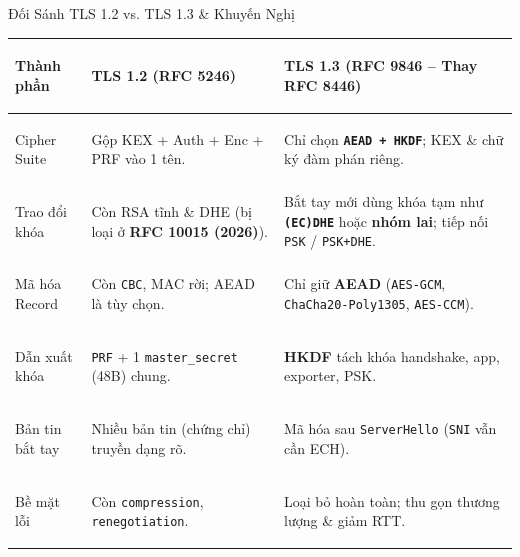 \documentclass[aspectratio=169, 10pt]{beamer}
\begin{document}
\begin{frame}{Đối Sánh TLS 1.2 vs. TLS 1.3 \& Khuyến Nghị}
	\centering
	\fontsize{6.1pt}{7.5pt}\selectfont
	\renewcommand{\arraystretch}{1.10}
	\setlength{\tabcolsep}{4.5pt}
	\begin{tabularx}{\textwidth}{>{\leavevmode\color{uetblue}\bfseries\raggedright\arraybackslash}p{2.35cm} >{\raggedright\arraybackslash}X >{\raggedright\arraybackslash}X}
		\toprule
		\rowcolor{uetaccentbg}
		Thành phần & \textbf{\color{uetblue}TLS 1.2 (RFC 5246)} & \textbf{\color{uetblue}TLS 1.3 (RFC 9846 -- Thay RFC 8446)} \\
		\midrule
		Cipher Suite & Gộp KEX + Auth + Enc + PRF vào 1 tên. & Chỉ chọn \textbf{\texttt{AEAD + HKDF}}; KEX \& chữ ký đàm phán riêng. \\
		\rowcolor{uetlightgray}
		Trao đổi khóa & Còn RSA tĩnh \& DHE (bị loại ở \textbf{RFC 10015 (2026)}). & Bắt tay mới dùng khóa tạm như \textbf{\texttt{(EC)DHE}} hoặc \textbf{nhóm lai}; tiếp nối \texttt{PSK} / \texttt{PSK+DHE}. \\
		Mã hóa Record & Còn \texttt{CBC}, MAC rời; AEAD là tùy chọn. & Chỉ giữ \textbf{AEAD} (\texttt{AES-GCM}, \texttt{ChaCha20-Poly1305}, \texttt{AES-CCM}). \\
		\rowcolor{uetlightgray}
		Dẫn xuất khóa & \texttt{PRF} + 1 \texttt{master\_secret} (48B) chung. & \textbf{HKDF} tách khóa handshake, app, exporter, PSK. \\
		Bản tin bắt tay & Nhiều bản tin (chứng chỉ) truyền dạng rõ. & Mã hóa sau \texttt{ServerHello} (\texttt{SNI} vẫn cần ECH). \\
		\rowcolor{uetlightgray}
		Bề mặt lỗi & Còn \texttt{compression}, \texttt{renegotiation}. & Loại bỏ hoàn toàn; thu gọn thương lượng \& giảm RTT. \\
		\bottomrule
	\end{tabularx}
	\vspace{0.07cm}


\end{frame}
\end{document}
